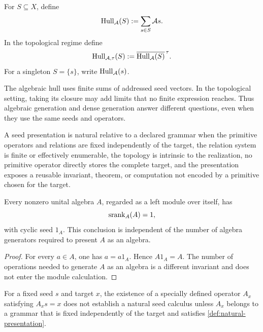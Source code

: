 \begin{definition}
\label{def:generated-hull}
For $S\subseteq X$, define
\[
\operatorname{Hull}_{\mathcal A}(S):=\sum_{s\in S}\mathcal A s.
\]
In the topological regime define
\[
\operatorname{Hull}_{\mathcal A,\tau}(S):=\overline{\operatorname{Hull}_{\mathcal A}(S)}^{\,\tau}.
\]
For a singleton $S=\{s\}$, write $\operatorname{Hull}_{\mathcal A}(s)$.
\end{definition}

The algebraic hull uses finite sums of addressed seed vectors.  In the topological setting, taking its closure may add limits that no finite expression reaches.  Thus algebraic generation and dense generation answer different questions, even when they use the same seeds and operators.

\begin{definition}
\label{def:natural-presentation}
A seed presentation is natural relative to a declared grammar when the primitive operators and relations are fixed independently of the target, the relation system is finite or effectively enumerable, the topology is intrinsic to the realization, no primitive operator directly stores the complete target, and the presentation exposes a reusable invariant, theorem, or computation not encoded by a primitive chosen for the target.
\end{definition}

\begin{proposition}
\label{prop:algebra-module-generation}
Every nonzero unital algebra $A$, regarded as a left module over itself, has
\[
\operatorname{srank}_A(A)=1,
\]
with cyclic seed $1_A$.  This conclusion is independent of the number of algebra generators required to present $A$ as an algebra.
\end{proposition}

\begin{proof}
For every $a\in A$, one has $a=a1_A$.  Hence $A1_A=A$.  The number of operations needed to generate $A$ as an algebra is a different invariant and does not enter the module calculation.
\end{proof}

\begin{boundary}
\label{bnd:target-dependent-operators}
For a fixed seed $s$ and target $x$, the existence of a specially defined operator $A_x$ satisfying $A_xs=x$ does not establish a natural seed calculus unless $A_x$ belongs to a grammar that is fixed independently of the target and satisfies \cref{def:natural-presentation}.
\end{boundary}

